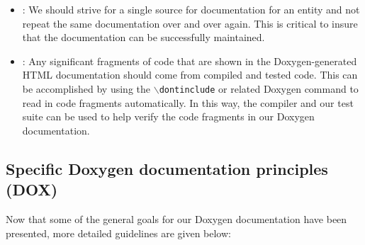 \begin{itemize}
{}\item\DOXPDoNotRepeat: We should strive for a single source for
documentation for an entity and not repeat the same documentation over and
over again.  This is critical to insure that the documentation can be
successfully maintained.


{}\item\DOXPDocumentationMaintainItself: Any significant fragments of code
that are shown in the Doxygen-generated HTML documentation should come from
compiled and tested code.  This can be accomplished by using the
{}\texttt{$\backslash$dontinclude} or related Doxygen command to read in code
fragments automatically.  In this way, the compiler and our test suite can be
used to help verify the code fragments in our Doxygen documentation.


\end{itemize}


%
\subsection{Specific Doxygen documentation principles (DOX)}
%

Now that some of the general goals for our Doxygen documentation have
been presented, more detailed guidelines are given below:


